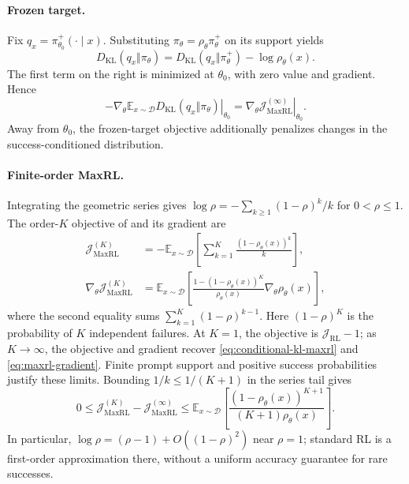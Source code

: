 \paragraph{Frozen target.}
Fix $q_x=\pi_{\theta_0}^+(\cdot\mid x)$. Substituting
$\pi_\theta=\rho_\theta\pi_\theta^+$ on its support yields
\begin{equation}
 D_{\mathrm{KL}}(q_x\Vert\pi_\theta)
 =D_{\mathrm{KL}}(q_x\Vert\pi_\theta^+)-\log\rho_\theta(x).
 \label{eq:app-success-frozen-decomposition}
\end{equation}
The first term on the right is minimized at $\theta_0$, with zero
value and gradient. Hence
\begin{equation}
 \left.-\nabla_\theta\mathbb E_{x\sim\mathcal D}
 D_{\mathrm{KL}}(q_x\Vert\pi_\theta)\right|_{\theta_0}
 =\left.\nabla_\theta\mathcal J_{\mathrm{MaxRL}}^{(\infty)}
 \right|_{\theta_0}.
 \label{eq:app-success-frozen-gradient}
\end{equation}
Away from $\theta_0$, the frozen-target objective additionally penalizes
changes in the success-conditioned distribution.

\paragraph{Finite-order MaxRL.}
Integrating the geometric series gives
$\log\rho=-\sum_{k\ge1}(1-\rho)^k/k$ for $0<\rho\le1$.
The order-$K$ objective of \citet{tajwar_maximum_2026} and its gradient are
\begin{align}
 \mathcal J_{\mathrm{MaxRL}}^{(K)}
 &=-\mathbb E_{x\sim\mathcal D}
       \left[\sum_{k=1}^{K}\frac{(1-\rho_\theta(x))^k}{k}\right],
 \label{eq:app-maxrl-truncation}\\
 \nabla_\theta\mathcal J_{\mathrm{MaxRL}}^{(K)}
 &=\mathbb E_{x\sim\mathcal D}
       \left[\frac{1-(1-\rho_\theta(x))^K}{\rho_\theta(x)}
                         \nabla_\theta\rho_\theta(x)\right],
 \label{eq:app-maxrl-truncated-gradient}
\end{align}
where the second equality sums $\sum_{k=1}^K(1-\rho)^{k-1}$.
Here $(1-\rho)^K$ is the probability of $K$ independent failures.
At $K=1$, the objective is $\mathcal J_{\mathrm{RL}}-1$; as
$K\to\infty$, the objective and gradient recover
\eqref{eq:conditional-kl-maxrl} and \eqref{eq:maxrl-gradient}.
Finite prompt support and positive success probabilities justify these
limits. Bounding $1/k\le1/(K+1)$ in the series tail gives
\begin{equation}
 0\le\mathcal J_{\mathrm{MaxRL}}^{(K)}
             -\mathcal J_{\mathrm{MaxRL}}^{(\infty)}
 \le\mathbb E_{x\sim\mathcal D}
       \left[\frac{(1-\rho_\theta(x))^{K+1}}
                    {(K+1)\rho_\theta(x)}\right].
 \label{eq:app-maxrl-truncation-error}
\end{equation}
In particular, $\log\rho=(\rho-1)+O((1-\rho)^2)$ near $\rho=1$;
standard RL is a first-order approximation there, without a uniform
accuracy guarantee for rare successes.

